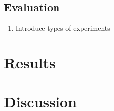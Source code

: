 \documentclass[12pt, fleqn]{article}
\begin{document}
\subsection{Evaluation}
\begin{enumerate}
    \item Introduce types of experiments
\end{enumerate}

\section{Results}%
\label{sec:results}

\section{Discussion}%
\label{sec:discussion}


\renewcommand*{\bibfont}{\normalfont\footnotesize}
\printbibliography[heading=bibintoc]

\appendix
{}
\end{document}
